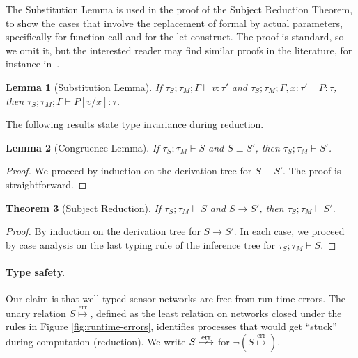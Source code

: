 \documentclass[copyright,creativecommons]{eptcs}
\newcommand{\disj}{\operatorname{,}}
\newcommand{\subs}[2]{[{#1}/{#2}]}
\newcommand{\congr}{\equiv}
\newcommand{\reduces}{\rightarrow}
\newcommand{\err}{\overset{\text{err}}{\longmapsto}}
\newcommand{\type}{\vdash}
\newcommand{\is}{\colon}
\newcommand{\nerr}{\overset{\text{err}}{\,\,\arrownot\!\!\longmapsto}}
\newtheorem{theorem}{Theorem}
\newtheorem{lemma}[theorem]{Lemma}
\begin{document}
The Substitution Lemma is used in the proof of the Subject Reduction
Theorem, to show the cases that involve the replacement of formal by
actual parameters, specifically for function call and for the let
construct.
The proof is standard, so we omit it, but the interested reader may
find similar proofs in the literature, for instance
in~\cite[Section 6.3]{sangiorgi.walker:theory-mobile}.

\begin{lemma}[Substitution Lemma]
  \label{lemma:substitution-lemma}
  If $\tau_S; \tau_M;\Gamma \type v \is \tau'$ and $\tau_S; \tau_M;\Gamma
  \disj x \is \tau' \type P \is \tau$, then $\tau_S; \tau_M;\Gamma \type
  P \subs v x \is \tau$.
\end{lemma}

The following results state type invariance during reduction.

\begin{lemma}[Congruence Lemma]
  \label{lemma:congruence}
  If $\tau_S; \tau_M \type S$ and $S \congr S'$, then $\tau_S;
  \tau_M \type S'$.
\end{lemma}

\begin{proof}
  We proceed by induction on the derivation tree for $S \congr S'$.
  The proof is straightforward.
\end{proof}

\begin{theorem}[Subject Reduction]
  \label{teo:subject-reduction}
  If $\tau_S; \tau_M \type S$ and $S \reduces S'$, then $\tau_S;
  \tau_M \type S'$.
\end{theorem}

\begin{proof}
  By induction on the derivation tree for $S \reduces S'$. 
In each case, we proceed by case analysis on the last typing rule of
  the inference tree for $\tau_S; \tau_M \type S$.
\end{proof}


\paragraph{Type safety.}
\label{sec:type-safety}
Our claim is that well-typed sensor networks are free from run-time errors.
The unary relation $S \err$, defined as the least relation on
networks closed under the rules in Figure
\ref{fig:runtime-errors}, identifies processes that would get ``stuck''
during computation (reduction).
We write $S \nerr$ for $\lnot (S \err)$.
\end{document}
